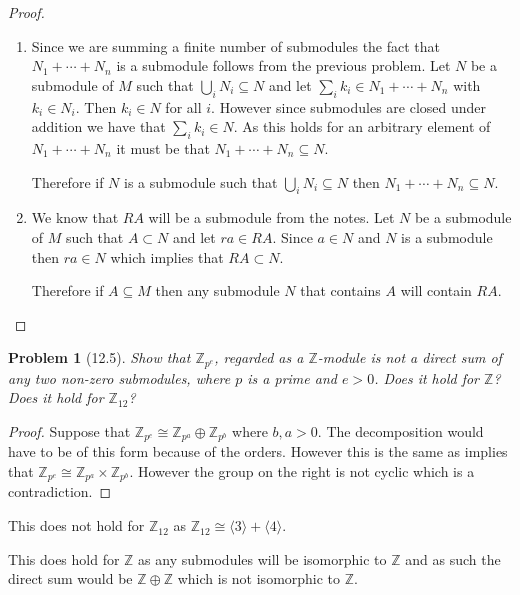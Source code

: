\documentclass[10pt]{article}
\newcommand{\sk}{\vskip 10mm}
\newcommand{\bb}[1]{\mathbb{#1}}
\theoremstyle{plain}
\newtheorem{problem}{Problem}
\theoremstyle{remark}
\begin{document}
\begin{proof}
  \begin{enumerate}
  \item Since we are summing a finite number of submodules the fact that
    $N_1+\cdots+N_n$ is a submodule follows from the previous problem. Let $N$
    be a submodule of $M$ such that $\bigcup_iN_i\subseteq N$ and let $\sum_ik_i\in N_1+\cdots+N_n$
    with $k_i\in N_i$. Then $k_i\in N$ for all $i$. However since submodules are
    closed under addition we have that $\sum_ik_i\in N$. As this holds for an
    arbitrary element of $N_1+\cdots+N_n$ it must be that $N_1+\cdots +N_n\subseteq N$.

    Therefore if $N$ is a submodule such that $\bigcup_i N_i\subseteq N$ then
    $N_1+\cdots+N_n\subseteq N$.
  \item We know that $RA$ will be a submodule from the notes. Let $N$ be a
    submodule of $M$ such that $A\subset N$ and let $ra\in RA$. Since $a\in N$ and
    $N$ is a submodule then $ra\in N$ which implies that $RA\subset N$.

    Therefore if $A\subseteq M$ then any submodule $N$ that contains $A$ will
    contain $RA$.
  \end{enumerate}
\end{proof}

\sk

\begin{problem}[12.5]
  Show that $\bb{Z}_{p^e}$, regarded as a $\bb{Z}$-module is not a
  direct sum of any two non-zero submodules, where $p$ is a prime and
  $e>0$. Does it hold for $\bb{Z}$? Does it hold for $\bb{Z}_{12}$?
\end{problem}

\begin{proof}
  Suppose that $\bb{Z}_{p^e}\cong\bb{Z}_{p^a}\oplus\bb{Z}_{p^b}$ where $b,a>0$. The
  decomposition would have to be of this form because of the orders.
  However this is the same as implies that $\bb{Z}_{p^e}\cong\bb{Z}_{p^a}\times\bb{Z}_{p^b}$.
  However the group on the right is not cyclic which is a contradiction.
\end{proof}

This does not hold for $\bb{Z}_{12}$ as $\bb{Z}_{12}\cong\langle 3\rangle+\langle 4\rangle$.

This does hold for $\bb{Z}$ as any submodules will be isomorphic to $\bb{Z}$
and as such the direct sum would be $\bb{Z}\oplus\bb{Z}$ which is not isomorphic to
$\bb{Z}$.

\sk
\end{document}
